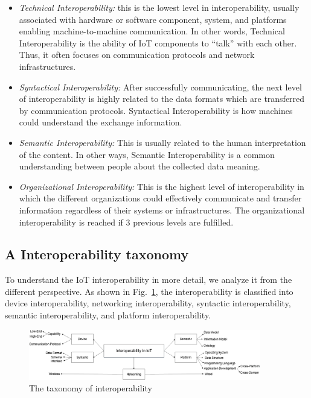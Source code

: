 \begin{itemize}

    \item \textit{Technical Interoperability: } this is the lowest level in interoperability, usually associated with hardware or software component, system, and platforms enabling machine-to-machine communication. In other words, Technical Interoperability is the ability of IoT components to ``talk'' with each other. Thus, it often focuses on communication protocols and network infrastructures. 
    
    \item \textit{Syntactical Interoperability: } After successfully communicating, the next level of interoperability is highly related to the data formats which are transferred by communication protocols. Syntactical Interoperability is how machines could understand the exchange information.
    
    \item \textit{Semantic Interoperability: } This is usually related to the human interpretation of the content. In other ways, Semantic Interoperability is a common understanding between people about the collected data meaning.
    
    \item \textit{Organizational Interoperability: } This is the highest level of interoperability in which the different organizations could effectively communicate and transfer information regardless of their systems or infrastructures. The organizational interoperability is reached if 3 previous levels are fulfilled.  
\end{itemize}



\subsection{A Interoperability taxonomy}

To understand the IoT interoperability in more detail, we analyze it from the different perspective. As shown in Fig.~\ref{fig:c2_platform_interoperability_overview}, the interoperability is classified into device interoperability, networking interoperability, syntactic interoperability, semantic interoperability, and platform interoperability. 



\begin{figure}[h!] 
 \begin{center} 
 \includegraphics[width=0.9\textwidth]{./Part1/Chapter2/figures/c2_platform_interoperability_overview.png} 
    \caption{The taxonomy of interoperability}
     \label{fig:c2_platform_interoperability_overview}
  \end{center} 
\end{figure}

